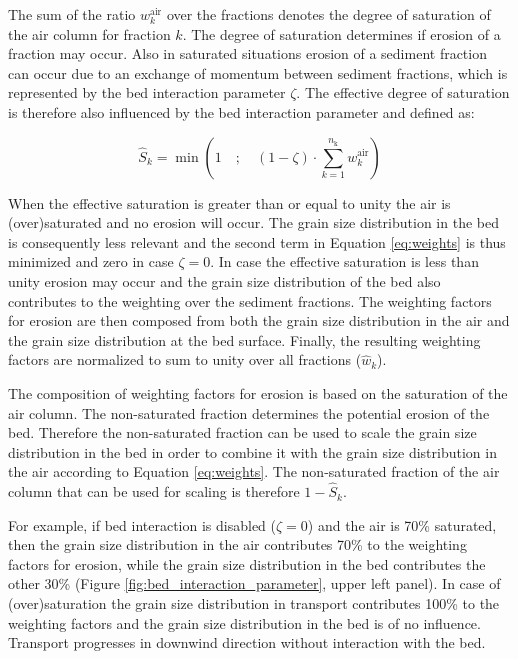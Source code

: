 \noindent The sum of the ratio $w^{\mathrm{air}}_k$ over the fractions
denotes the degree of saturation of the air column for fraction
$k$. The degree of saturation determines if erosion of a fraction may
occur. Also in saturated situations erosion of a sediment fraction can
occur due to an exchange of momentum between sediment fractions, which
is represented by the bed interaction parameter $\zeta$. The effective
degree of saturation is therefore also influenced by the bed
interaction parameter and defined as:

\begin{equation}
  \hat{S}_k = \min \left ( 1 \quad ; \quad (1 - \zeta) \cdot \sum_{k=1}^{n_{\mathrm{k}}} w_k^{\mathrm{air}} \right )
\end{equation}

When the effective saturation is greater than or equal to unity the
air is (over)saturated and no erosion will occur. The grain size
distribution in the bed is consequently less relevant and the second
term in Equation \ref{eq:weights} is thus minimized and zero in case
$\zeta = 0$. In case the effective saturation is less than unity erosion
may occur and the grain size distribution of the bed also contributes
to the weighting over the sediment fractions. The weighting factors
for erosion are then composed from both the grain size distribution in
the air and the grain size distribution at the bed surface. Finally,
the resulting weighting factors are normalized to sum to unity over
all fractions ($\hat{w}_k$).

The composition of weighting factors for erosion is based on the
saturation of the air column. The non-saturated fraction determines
the potential erosion of the bed. Therefore the non-saturated fraction
can be used to scale the grain size distribution in the bed in order
to combine it with the grain size distribution in the air according to
Equation \ref{eq:weights}. The non-saturated fraction of the air
column that can be used for scaling is therefore $1 - \hat{S}_k$.

For example, if bed interaction is disabled ($\zeta = 0$) and the air is
70\% saturated, then the grain size distribution in the air
contributes 70\% to the weighting factors for erosion, while the grain
size distribution in the bed contributes the other 30\% (Figure
\ref{fig:bed_interaction_parameter}, upper left panel). In case of
(over)saturation the grain size distribution in transport contributes
100\% to the weighting factors and the grain size distribution in the
bed is of no influence. Transport progresses in downwind direction
without interaction with the bed.

